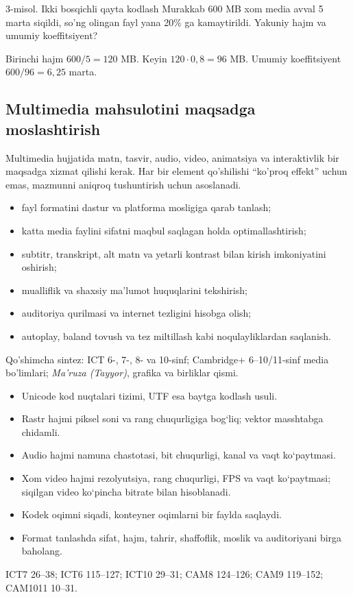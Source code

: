 \documentclass[11pt,a4paper,oneside]{book}
\newcommand{\difficulty}[1]{\hfill\textcolor{Muted}{\scriptsize\sffamily #1}}
\newcommand{\sourcecite}[1]{\begin{sourcebox}\small #1\end{sourcebox}}
\begin{document}
\begin{examplebox}{3-misol. Ikki bosqichli qayta kodlash \difficulty{Murakkab}}
600 MB xom media avval 5 marta siqildi, so'ng olingan fayl yana 20\% ga kamaytirildi. Yakuniy hajm va umumiy koeffitsiyent?
\begin{solutionbox}
Birinchi hajm $600/5=120$ MB. Keyin $120\cdot0,8=96$ MB. Umumiy koeffitsiyent $600/96=6,25$ marta.
\end{solutionbox}
\end{examplebox}
\subsection{Multimedia mahsulotini maqsadga moslashtirish}
Multimedia hujjatida matn, tasvir, audio, video, animatsiya va interaktivlik bir maqsadga xizmat qilishi kerak. Har bir element qo'shilishi “ko'proq effekt” uchun emas, mazmunni aniqroq tushuntirish uchun asoslanadi.
\begin{itemize}
\item fayl formatini dastur va platforma mosligiga qarab tanlash;
\item katta media faylini sifatni maqbul saqlagan holda optimallashtirish;
\item subtitr, transkript, alt matn va yetarli kontrast bilan kirish imkoniyatini oshirish;
\item mualliflik va shaxsiy ma'lumot huquqlarini tekshirish;
\item auditoriya qurilmasi va internet tezligini hisobga olish;
\item autoplay, baland tovush va tez miltillash kabi noqulayliklardan saqlanish.
\end{itemize}

\sourcecite{Qo'shimcha sintez: ICT 6-, 7-, 8- va 10-sinf; Cambridge+ 6--10/11-sinf media bo'limlari; \textit{Ma'ruza (Tayyor)}, grafika va birliklar qismi.}

\begin{recapbox}
\begin{itemize}
\item Unicode kod nuqtalari tizimi, UTF esa baytga kodlash usuli.
\item Rastr hajmi piksel soni va rang chuqurligiga bog‘liq; vektor masshtabga chidamli.
\item Audio hajmi namuna chastotasi, bit chuqurligi, kanal va vaqt ko‘paytmasi.
\item Xom video hajmi rezolyutsiya, rang chuqurligi, FPS va vaqt ko‘paytmasi; siqilgan video ko‘pincha bitrate bilan hisoblanadi.
\item Kodek oqimni siqadi, konteyner oqimlarni bir faylda saqlaydi.
\item Format tanlashda sifat, hajm, tahrir, shaffoflik, moslik va auditoriyani birga baholang.
\end{itemize}
\end{recapbox}
\sourcecite{ICT7 26--38; ICT6 115--127; ICT10 29--31; CAM8 124--126; CAM9 119--152; CAM1011 10--31.}
\end{document}
